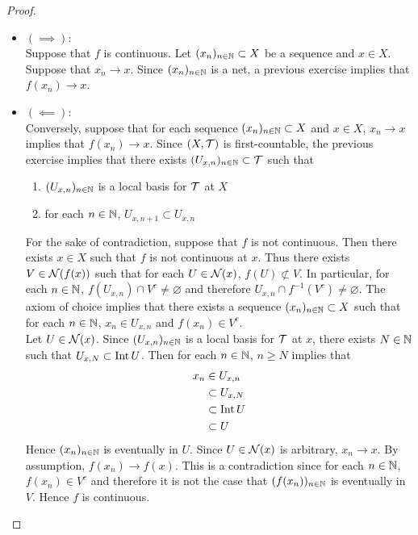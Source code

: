 \documentclass{book}
\begin{document}
	\begin{proof}\
		\begin{itemize}
			\item $(\implies)$: \\ 
			Suppose that $f$ is continuous. Let $(x_n)_{n \in \mathbb{N}} \subset X$ be a sequence and $x \in X$. Suppose that $x_n \rightarrow x$. Since $(x_n)_{n \in \mathbb{N}}$ is a net, a previous exercise implies that $f(x_n) \rightarrow x$. \\
			\item $(\impliedby)$: \\
			Conversely, suppose that for each sequence $(x_n)_{n \in \mathbb{N}} \subset X$ and $x \in X$, $x_n \rightarrow x$ implies that $f(x_n) \rightarrow x$. Since $(X, \mathcal{T})$ is first-countable, the previous exercise implies that there exists $(U_{x, n})_{n \in \mathbb{N}} \subset \mathcal{T}$ such that 
			\begin{enumerate}
				\item $(U_{x, n})_{n \in \mathbb{N}}$ is a local basis for $\mathcal{T}$ at $X$
				\item for each $n \in \mathbb{N}$, $U_{x, n+1} \subset U_{x, n}$
			\end{enumerate}
			For the sake of contradiction, suppose that $f$ is not continuous. Then there exists $x \in X$ such that $f$ is not continuous at $x$. Thus there exists $V \in \mathcal{N}(f(x))$ such that for each $U \in \mathcal{N}(x)$, $f(U) \not \subset V$.
			In particular, for each $n \in \mathbb{N}$, $f(U_{x,n}) \cap V^c \neq \varnothing$ and therefore $U_{x,n} \cap f^{-1}(V^c) \neq \varnothing$. The axiom of choice implies that there exists a sequence $(x_n)_{n \in \mathbb{N}} \subset X$ such that for each $n \in \mathbb{N}$, $x_n \in U_{x,n}$ and $f(x_n) \in V^c$. \\
			Let $U \in \mathcal{N}(x)$. Since $(U_{x,n})_{n \in \mathbb{N}}$ is a local basis for $\mathcal{T}$ at $x$, there exists $N \in \mathbb{N}$ such that $U_{x,N} \subset \operatorname{Int} U$. Then for each $n \in \mathbb{N}$, $n \geq N$ implies that 
			\begin{align*}
				x_n
				& \in U_{x,n} \\
				& \subset U_{x,N} \\
				& \subset \operatorname{Int} U \\
				& \subset U
			\end{align*}
			Hence $(x_n)_{n \in \mathbb{N}}$ is eventually in $U$. Since $U \in \mathcal{N}(x)$ is arbitrary, $x_n \rightarrow x$. By assumption, $f(x_n) \rightarrow f(x)$. This is a contradiction since for each $n \in \mathbb{N}$, $f(x_n) \in V^c$ and therefore it is not the case that $(f(x_n))_{n \in \mathbb{N}}$ is eventually in $V$. Hence $f$ is continuous.  
		\end{itemize}
	\end{proof}
	
\end{document}

